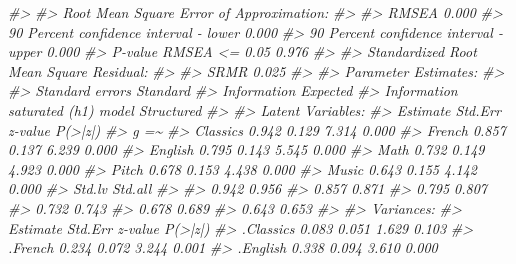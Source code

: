 \documentclass[
  11pt,
]{krantz}
\makeatletter
\newenvironment{Shaded}{\begin{snugshade}}{\end{snugshade}}
\newcommand{\CommentTok}[1]{\textcolor[rgb]{0.37,0.37,0.37}{\textit{#1}}}
\newenvironment{kframe}{%
\medskip{}
\setlength{\fboxsep}{.8em}
 \def\at@end@of@kframe{}%
 \ifinner\ifhmode%
  \def\at@end@of@kframe{\end{minipage}}%
  \begin{minipage}{\columnwidth}%
 \fi\fi%
 \def\FrameCommand##1{\hskip\@totalleftmargin \hskip-\fboxsep
 \colorbox{shadecolor}{##1}\hskip-\fboxsep
     \hskip-\linewidth \hskip-\@totalleftmargin \hskip\columnwidth}%
 \MakeFramed {\advance\hsize-\width
   \@totalleftmargin\z@ \linewidth\hsize
   \@setminipage}}%
 {\par\unskip\endMakeFramed%
 \at@end@of@kframe}
\renewenvironment{Shaded}{\begin{kframe}}{\end{kframe}}
\theoremstyle{definition}
\theoremstyle{definition}
\theoremstyle{definition}
\theoremstyle{definition}
\theoremstyle{remark}
\makeatother
\begin{document}
\begin{Shaded}
\begin{Highlighting}[]
\CommentTok{\#\textgreater{} }
\CommentTok{\#\textgreater{} Root Mean Square Error of Approximation:}
\CommentTok{\#\textgreater{} }
\CommentTok{\#\textgreater{}   RMSEA                                          0.000}
\CommentTok{\#\textgreater{}   90 Percent confidence interval {-} lower         0.000}
\CommentTok{\#\textgreater{}   90 Percent confidence interval {-} upper         0.000}
\CommentTok{\#\textgreater{}   P{-}value RMSEA \textless{}= 0.05                          0.976}
\CommentTok{\#\textgreater{} }
\CommentTok{\#\textgreater{} Standardized Root Mean Square Residual:}
\CommentTok{\#\textgreater{} }
\CommentTok{\#\textgreater{}   SRMR                                           0.025}
\CommentTok{\#\textgreater{} }
\CommentTok{\#\textgreater{} Parameter Estimates:}
\CommentTok{\#\textgreater{} }
\CommentTok{\#\textgreater{}   Standard errors                             Standard}
\CommentTok{\#\textgreater{}   Information                                 Expected}
\CommentTok{\#\textgreater{}   Information saturated (h1) model          Structured}
\CommentTok{\#\textgreater{} }
\CommentTok{\#\textgreater{} Latent Variables:}
\CommentTok{\#\textgreater{}                    Estimate  Std.Err  z{-}value  P(\textgreater{}|z|)}
\CommentTok{\#\textgreater{}   g =\textasciitilde{}                                                }
\CommentTok{\#\textgreater{}     Classics          0.942    0.129    7.314    0.000}
\CommentTok{\#\textgreater{}     French            0.857    0.137    6.239    0.000}
\CommentTok{\#\textgreater{}     English           0.795    0.143    5.545    0.000}
\CommentTok{\#\textgreater{}     Math              0.732    0.149    4.923    0.000}
\CommentTok{\#\textgreater{}     Pitch             0.678    0.153    4.438    0.000}
\CommentTok{\#\textgreater{}     Music             0.643    0.155    4.142    0.000}
\CommentTok{\#\textgreater{}    Std.lv  Std.all}
\CommentTok{\#\textgreater{}                   }
\CommentTok{\#\textgreater{}     0.942    0.956}
\CommentTok{\#\textgreater{}     0.857    0.871}
\CommentTok{\#\textgreater{}     0.795    0.807}
\CommentTok{\#\textgreater{}     0.732    0.743}
\CommentTok{\#\textgreater{}     0.678    0.689}
\CommentTok{\#\textgreater{}     0.643    0.653}
\CommentTok{\#\textgreater{} }
\CommentTok{\#\textgreater{} Variances:}
\CommentTok{\#\textgreater{}                    Estimate  Std.Err  z{-}value  P(\textgreater{}|z|)}
\CommentTok{\#\textgreater{}    .Classics          0.083    0.051    1.629    0.103}
\CommentTok{\#\textgreater{}    .French            0.234    0.072    3.244    0.001}
\CommentTok{\#\textgreater{}    .English           0.338    0.094    3.610    0.000}

\end{Highlighting}
\end{Shaded}
\end{document}
